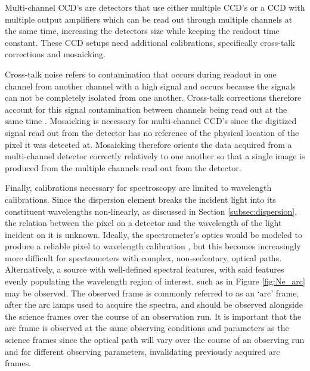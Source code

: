 Multi-channel \gls{CCD}'s are detectors that use either multiple \gls{CCD}'s or a \gls{CCD} with multiple output amplifiers which can be read out through multiple channels at the same time, increasing the detectors size while keeping the readout time constant. These \gls{CCD} setups need additional calibrations, specifically cross-talk corrections and mosaicking.
\prgph

Cross-talk noise refers to contamination that occurs during readout in one channel from another channel with a high signal and occurs because the signals can not be completely isolated from one another. Cross-talk corrections therefore account for this signal contamination between channels being read out at the same time \citep{CrossTalk}. Mosaicking is necessary for multi-channel \gls{CCD}'s since the digitized signal read out from the detector has no reference of the physical location of the pixel it was detected at. Mosaicking therefore orients the data acquired from a multi-channel detector correctly relatively to one another so that a single image is produced from the multiple channels read out from the detector.
\prgph

Finally, calibrations necessary for spectroscopy are limited to wavelength calibrations. Since the dispersion element breaks the incident light into its constituent wavelengths non-linearly, as discussed in Section \ref{subsec:dispersion}, the relation between the pixel on a detector and the wavelength of the light incident on it is unknown. Ideally, the spectrometer's optics would be modeled to produce a reliable pixel to wavelength calibration \citep[see Eg.][]{WavCalSpectraModel}, but this becomes increasingly more difficult for spectrometers with complex, non-sedentary, optical paths. Alternatively, a source with well-defined spectral features, with said features evenly populating the wavelength region of interest, such as in Figure \ref{fig:Ne_arc} may be observed. The observed frame is commonly referred to as an `arc' frame, after the arc lamps used to acquire the spectra, and should be observed alongside the science frames over the course of an observation run. It is important that the arc frame is observed at the same observing conditions and parameters as the science frames since the optical path will vary over the course of an observing run and for different observing parameters, invalidating previously acquired arc frames.
\prgph

